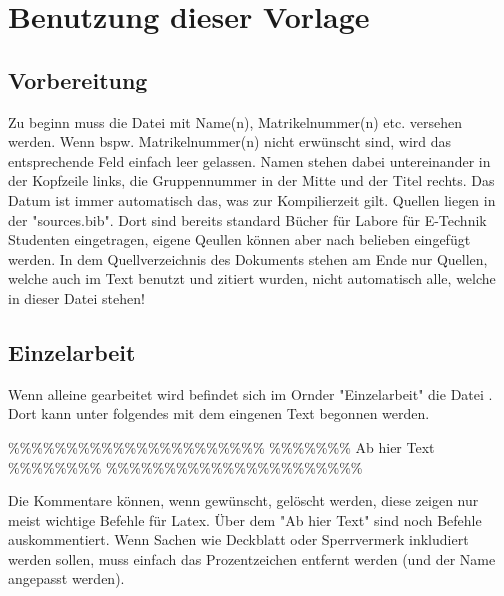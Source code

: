 \documentclass[
12pt,
a4paper,
headings=small,                    %
bibliography=totoc,                %
listof=totoc,                      %
parskip=half*,                     %
]{scrartcl}                        %
\begin{document}
	
	\newpage
	\section{Benutzung dieser Vorlage}
	\subsection{Vorbereitung}
	Zu beginn muss die Datei  mit Name(n), Matrikelnummer(n) etc. versehen werden. Wenn bspw. Matrikelnummer(n) nicht erwünscht sind, wird das entsprechende Feld einfach leer gelassen.\newline
	Namen stehen dabei untereinander in der Kopfzeile links, die Gruppennummer in der Mitte und der Titel rechts.
	Das Datum ist immer automatisch das, was zur Kompilierzeit gilt.\newline
	Quellen liegen in der "sources.bib". Dort sind bereits standard Bücher für Labore für E-Technik Studenten eingetragen, eigene Qeullen können aber nach belieben eingefügt werden. In dem Quellverzeichnis des Dokuments stehen am Ende nur Quellen, welche auch im Text benutzt und zitiert wurden, nicht automatisch alle, welche in dieser Datei stehen!
	\subsection{Einzelarbeit}
	Wenn alleine gearbeitet wird befindet sich im Ornder "Einzelarbeit" die Datei . Dort kann unter folgendes mit dem eingenen Text begonnen werden.\newline\newline
	
	\%\%\%\%\%\%\%\%\%\%\%\%\%\%\%\%\%\%\%\%\%\%\newline
	\%\%\%\%\%\%\% Ab hier Text \%\%\%\%\%\%\%\%\newline
	\%\%\%\%\%\%\%\%\%\%\%\%\%\%\%\%\%\%\%\%\%\%\newline\newline
	
	Die Kommentare können, wenn gewünscht, gelöscht werden, diese zeigen nur meist wichtige Befehle für Latex.\newline
	Über dem "Ab hier Text" sind noch Befehle auskommentiert. Wenn Sachen wie Deckblatt oder Sperrvermerk inkludiert werden sollen, muss einfach das Prozentzeichen entfernt werden (und der Name angepasst werden).
	
\end{document}

